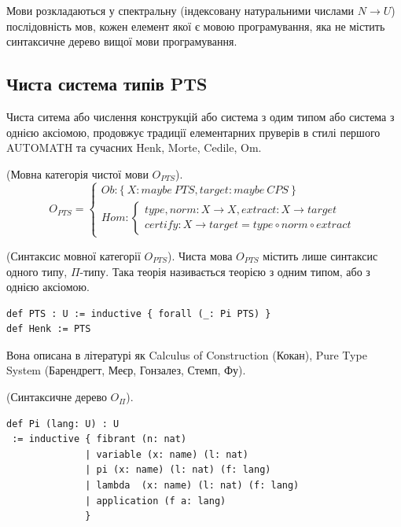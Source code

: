 Мови розкладаються у спектральну (індексовану натуральними числами $N \rightarrow U$)
послідовність мов, кожен елемент якої є мовою програмування,
яка не містить синтаксичне дерево вищої мови програмування.

\newpage
\subsection{Чиста система типів PTS}
Чиста ситема або числення конструкцій або система з одим типом або
система з однією аксіомою, продовжує традиції елементарних пруверів
в стилі першого AUTOMATH та сучасних Henk, Morte, Cedile, Om.

\begin{definition} (Мовна категорія чистої мови $O_{PTS}$).
\begin{equation}
O_{PTS} =
\begin{cases}
Ob: \{\ X: maybe\ PTS, target: maybe\ CPS \ \} \\
Hom: \begin{cases}
type,norm: X \rightarrow X, extract: X \rightarrow target \\
certify: X \rightarrow target = type \circ norm \circ extract
\end{cases}
\end{cases}
\end{equation}
\end{definition}

\begin{definition} (Синтаксис мовної категорії $O_{PTS}$).
Чиста мова $O_{PTS}$ містить лише синтаксис одного типу, $\Pi$-типу.
Така теорія називається теорією з одним типом, або з однією аксіомою.
\begin{lstlisting}
def PTS : U := inductive { forall (_: Pi PTS) }
def Henk := PTS
\end{lstlisting}
\end{definition}

Вона описана в літературі як Calculus of Construction (Кокан),
Pure Type System (Барендрегт, Меєр, Гонзалез, Стемп, Фу).

\begin{definition} (Синтаксичне дерево $O_\Pi$).
\begin{lstlisting}[mathescape=true]
def Pi (lang: U) : U
 := inductive { fibrant (n: nat)
              | variable (x: name) (l: nat)
              | pi (x: name) (l: nat) (f: lang)
              | lambda  (x: name) (l: nat) (f: lang)
              | application (f a: lang)
              }
\end{lstlisting}
\end{definition}

